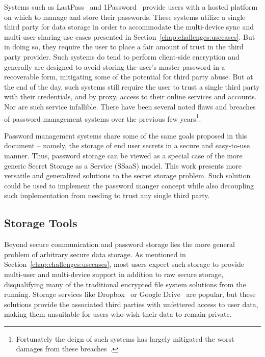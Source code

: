Systems such as LastPass~\cite{lastpass} and
1Password~\cite{onepassword} provide users with a hosted platform on
which to manage and store their passwords. These systems utilize a
single third party for data storage in order to accommodate the
multi-device sync and multi-user sharing use cases presented in
Section~\ref{chap:challenges:usecases}. But in doing so, they require
the user to place a fair amount of trust in the third party
provider. Such systems do tend to perform client-side encryption and
generally are designed to avoid storing the user's master password in
a recoverable form, mitigating some of the potential for third party
abuse. But at the end of the day, such systems still require the user
to trust a single third party with their credentials, and by proxy,
access to their online services and accounts. Nor are such service
infallible. There have been several noted flaws and breaches of
password management systems over the previous few
years\footnote{Fortunately the deign of such systems has largely
  mitigated the worst damages from these
  breaches~\cite{ducklin2015}.}\cite{blackhat-lastpass,
  changedmy-lastpass, lastpass-blog-breach}.

Password management systems share some of the same goals proposed in
this document -- namely, the storage of end user secrets in a secure
and easy-to-use manner. Thus, password storage can be viewed as a
special case of the more generic Secret Storage as a Service (SSaaS)
model. This work presents more versatile and generalized solutions to
the secret storage problem. Such solution could be used to implement
the password manger concept while also decoupling such implementation
from needing to trust any single third party.

\subsection{Storage Tools}

Beyond secure communication and password storage lies the more general
problem of arbitrary secure data storage. As mentioned in
Section~\ref{chap:challenges:usecases}, most users expect such storage
to provide multi-user and multi-device support in addition to raw
secure storage, disqualifying many of the traditional encrypted file
system solutions from the running. Storage services like
Dropbox~\cite{dropbox} or Google Drive~\cite{google-drive} are
popular, but these solutions provide the associated third parties with
unfettered access to user data, making them unsuitable for users who
wish their data to remain private.

